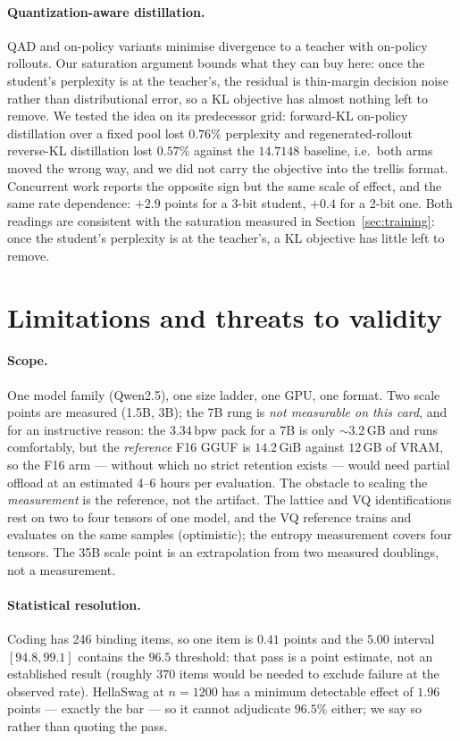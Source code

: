 \documentclass[11pt,a4paper]{article}
\newcommand{\bpw}{\,\mathrm{bpw}}
\begin{document}
\paragraph{Quantization-aware distillation.} QAD and on-policy variants minimise divergence to a
teacher with on-policy rollouts. Our saturation argument bounds what they can buy here: once the
student's perplexity is at the teacher's, the residual is thin-margin decision noise rather than
distributional error, so a KL objective has almost nothing left to remove. We tested the
idea on its predecessor grid: forward-KL on-policy distillation over a fixed pool lost $0.76\%$
perplexity and regenerated-rollout reverse-KL distillation lost $0.57\%$ against the $14.7148$
baseline, i.e.\ both arms moved the wrong way, and we did not carry the objective into the
trellis format. Concurrent work reports the opposite sign but the same scale of effect, and the
same rate dependence: $+2.9$ points for a 3-bit student, $+0.4$ for a 2-bit one. Both readings are
consistent with the saturation measured in Section~\ref{sec:training}: once the student's
perplexity is at the teacher's, a KL objective has little left to remove.

\section{Limitations and threats to validity}
\label{sec:limitations}

\paragraph{Scope.} One model family (Qwen2.5), one size ladder, one GPU, one format. Two scale
points are measured (1.5B, 3B); the 7B rung is \emph{not measurable on this card}, and for an
instructive reason: the $3.34\bpw$ pack for a 7B is only $\sim$3.2\,GB and runs comfortably, but the
\emph{reference} F16 GGUF is $14.2$\,GiB against $12$\,GB of VRAM, so the F16 arm --- without which
no strict retention exists --- would need partial offload at an estimated 4--6 hours per evaluation.
The obstacle to scaling the \emph{measurement} is the reference, not the artifact. The lattice and
VQ identifications rest on two to four tensors of one model, and the VQ reference trains and
evaluates on the same samples (optimistic); the entropy measurement covers four tensors. The 35B
scale point is an extrapolation from two measured doublings, not a measurement.

\paragraph{Statistical resolution.} Coding has 246 binding items, so one item is $0.41$ points and
the $5.00$ interval $[94.8,99.1]$ contains the $96.5$ threshold: that pass is a point estimate,
not an established result (roughly $370$ items would be needed to exclude failure at the observed
rate). HellaSwag at $n=1200$ has a minimum detectable effect of $1.96$ points --- exactly the bar
--- so it cannot adjudicate $96.5\%$ either; we say so rather than quoting the pass.
\end{document}
